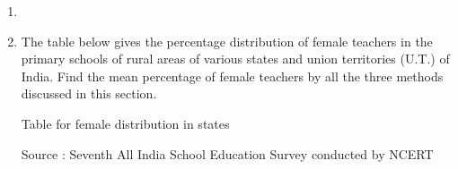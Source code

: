 \renewcommand{\theequation}{\theenumi}
\begin{enumerate}[label=\arabic*.,ref=\thesubsection.\theenumi]
\item
\item The table below gives the percentage distribution of female teachers in the primary schools of rural areas of various states and union territories (U.T.) of India. Find the mean percentage of female teachers by all the three methods discussed
in this section.\\
\begin{table}[!ht]
	\centering
	
	\caption{ Table for female distribution in states}
\end{table}
Source : Seventh All India School Education Survey conducted by NCERT
\end{enumerate}